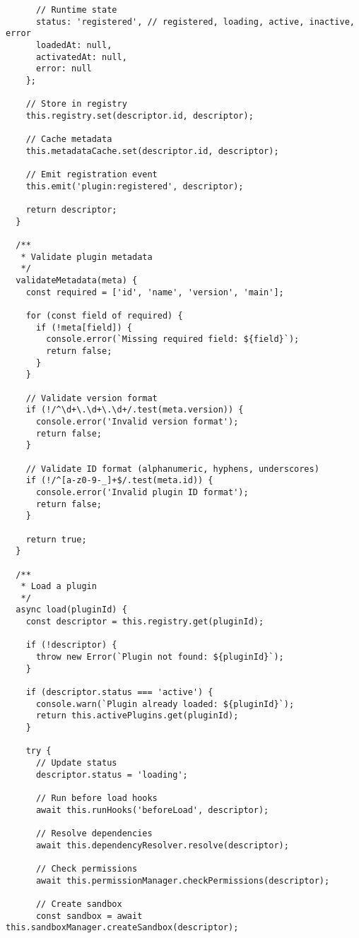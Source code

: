 \documentclass[11pt]{article}
\begin{document}
\begin{verbatim}
      // Runtime state
      status: 'registered', // registered, loading, active, inactive, error
      loadedAt: null,
      activatedAt: null,
      error: null
    };
    
    // Store in registry
    this.registry.set(descriptor.id, descriptor);
    
    // Cache metadata
    this.metadataCache.set(descriptor.id, descriptor);
    
    // Emit registration event
    this.emit('plugin:registered', descriptor);
    
    return descriptor;
  }
  
  /**
   * Validate plugin metadata
   */
  validateMetadata(meta) {
    const required = ['id', 'name', 'version', 'main'];
    
    for (const field of required) {
      if (!meta[field]) {
        console.error(`Missing required field: ${field}`);
        return false;
      }
    }
    
    // Validate version format
    if (!/^\d+\.\d+\.\d+/.test(meta.version)) {
      console.error('Invalid version format');
      return false;
    }
    
    // Validate ID format (alphanumeric, hyphens, underscores)
    if (!/^[a-z0-9-_]+$/.test(meta.id)) {
      console.error('Invalid plugin ID format');
      return false;
    }
    
    return true;
  }
  
  /**
   * Load a plugin
   */
  async load(pluginId) {
    const descriptor = this.registry.get(pluginId);
    
    if (!descriptor) {
      throw new Error(`Plugin not found: ${pluginId}`);
    }
    
    if (descriptor.status === 'active') {
      console.warn(`Plugin already loaded: ${pluginId}`);
      return this.activePlugins.get(pluginId);
    }
    
    try {
      // Update status
      descriptor.status = 'loading';
      
      // Run before load hooks
      await this.runHooks('beforeLoad', descriptor);
      
      // Resolve dependencies
      await this.dependencyResolver.resolve(descriptor);
      
      // Check permissions
      await this.permissionManager.checkPermissions(descriptor);
      
      // Create sandbox
      const sandbox = await this.sandboxManager.createSandbox(descriptor);
      

\end{verbatim}
\end{document}

